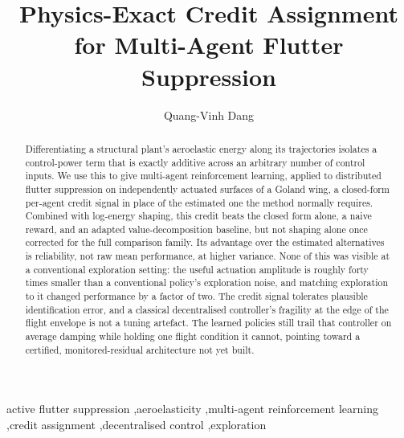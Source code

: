 \documentclass[preprint,11pt]{elsarticle}
\begin{document}
\begin{frontmatter}

\title{Physics-Exact Credit Assignment for Multi-Agent Flutter Suppression}

\author{Quang-Vinh Dang}

\begin{abstract}
Differentiating a structural plant's aeroelastic energy along its
trajectories isolates a control-power term that is exactly additive across an
arbitrary number of control inputs. We use this to give multi-agent
reinforcement learning, applied to distributed flutter suppression on
independently actuated surfaces of a Goland wing, a closed-form per-agent
credit signal in place of the estimated one the method normally requires.
Combined with log-energy shaping, this credit beats the closed form alone, a
naive reward, and an adapted value-decomposition baseline, but not shaping
alone once corrected for the full comparison family. Its advantage over the
estimated alternatives is reliability, not raw mean performance, at higher
variance. None of this was visible at a conventional exploration setting:
the useful actuation amplitude is roughly forty times smaller than a
conventional policy's exploration noise, and matching exploration to it
changed performance by a factor of two. The credit signal tolerates
plausible identification error, and a classical decentralised controller's
fragility at the edge of the flight envelope is not a tuning artefact. The
learned policies still trail that controller on average damping while
holding one flight condition it cannot, pointing toward a certified,
monitored-residual architecture not yet built.
\end{abstract}

\begin{keyword}
active flutter suppression \sep aeroelasticity \sep multi-agent reinforcement
learning \sep credit assignment \sep decentralised control \sep exploration
\end{keyword}

\end{frontmatter}
\end{document}
